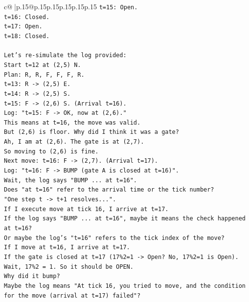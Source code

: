 \documentclass{article}
\begin{document}
{\begin{supertabular}{c@{$\;$}|p{.15\linewidth}@{}p{.15\linewidth}p{.15\linewidth}p{.15\linewidth}p{.15\linewidth}p{.15\linewidth}}
{{{\texttt{t=15: Open.} \\
\texttt{t=16: Closed.} \\
\texttt{t=17: Open.} \\
\texttt{t=18: Closed.} \\
\\ 
\texttt{Let's re{-}simulate the log provided:} \\
\texttt{Start t=12 at (2,5) N.} \\
\texttt{Plan: R, R, F, F, F, R.} \\
\texttt{t=13: R {-}> (2,5) E.} \\
\texttt{t=14: R {-}> (2,5) S.} \\
\texttt{t=15: F {-}> (2,6) S. (Arrival t=16).} \\
\texttt{Log: "t=15: F {-}> OK, now at (2,6)."} \\
\texttt{This means at t=16, the move was valid.} \\
\texttt{But (2,6) is floor. Why did I think it was a gate?} \\
\texttt{Ah, I am at (2,6). The gate is at (2,7).} \\
\texttt{So moving to (2,6) is fine.} \\
\texttt{Next move: t=16: F {-}> (2,7). (Arrival t=17).} \\
\texttt{Log: "t=16: F {-}> BUMP (gate A is closed at t=16)".} \\
\texttt{Wait, the log says "BUMP ... at t=16".} \\
\texttt{Does "at t=16" refer to the arrival time or the tick number?} \\
\texttt{"One step t {-}> t+1 resolves...".} \\
\texttt{If I execute move at tick 16, I arrive at t=17.} \\
\texttt{If the log says "BUMP ... at t=16", maybe it means the check happened at t=16?} \\
\texttt{Or maybe the log's "t=16" refers to the tick index of the move?} \\
\texttt{If I move at t=16, I arrive at t=17.} \\
\texttt{If the gate is closed at t=17 (17\%2=1 {-}> Open? No, 17\%2=1 is Open).} \\
\texttt{Wait, 17\%2 = 1. So it should be OPEN.} \\
\texttt{Why did it bump?} \\
\texttt{Maybe the log means "At tick 16, you tried to move, and the condition for the move (arrival at t=17) failed"?} \\
}}}
\end{supertabular}}
\end{document}
